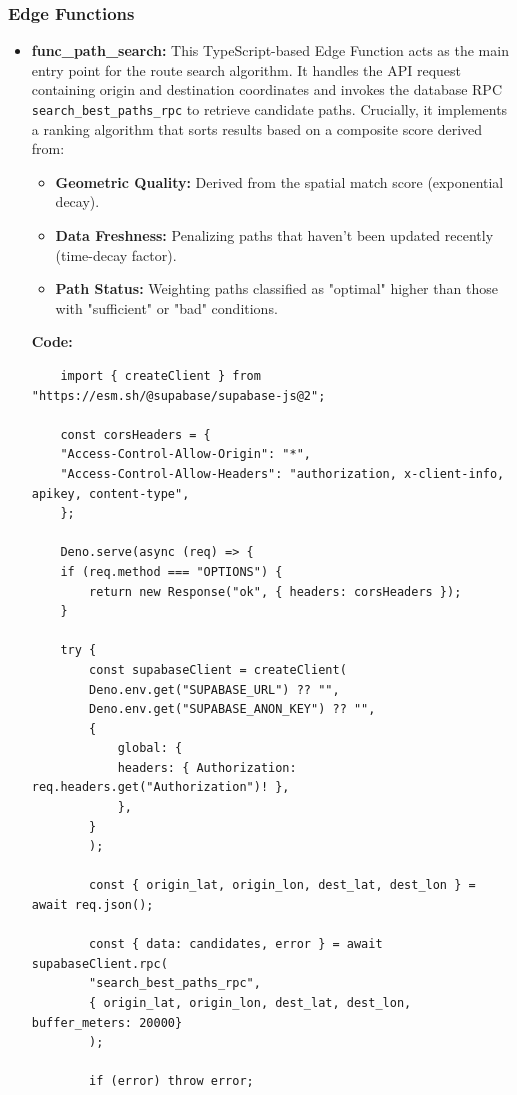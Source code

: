 \subsubsection{Edge Functions}
\begin{itemize}
    \item \textbf{func\_path\_search:} 
    This TypeScript-based Edge Function acts as the main entry point for the route search algorithm. It handles the API request containing origin and destination coordinates and invokes the database RPC \texttt{search\_best\_paths\_rpc} to retrieve candidate paths. 
    Crucially, it implements a ranking algorithm that sorts results based on a composite score derived from:
    \begin{itemize}
        \item \textbf{Geometric Quality:} Derived from the spatial match score (exponential decay).
        \item \textbf{Data Freshness:} Penalizing paths that haven't been updated recently (time-decay factor).
        \item \textbf{Path Status:} Weighting paths classified as "optimal" higher than those with "sufficient" or "bad" conditions.
    \end{itemize}
    \textbf{Code:}
    \begin{lstlisting} 
    import { createClient } from "https://esm.sh/@supabase/supabase-js@2";

    const corsHeaders = {
    "Access-Control-Allow-Origin": "*",
    "Access-Control-Allow-Headers": "authorization, x-client-info, apikey, content-type",
    };

    Deno.serve(async (req) => {
    if (req.method === "OPTIONS") {
        return new Response("ok", { headers: corsHeaders });
    }

    try {
        const supabaseClient = createClient(
        Deno.env.get("SUPABASE_URL") ?? "",
        Deno.env.get("SUPABASE_ANON_KEY") ?? "",
        {
            global: {
            headers: { Authorization: req.headers.get("Authorization")! },
            },
        }
        );

        const { origin_lat, origin_lon, dest_lat, dest_lon } = await req.json();

        const { data: candidates, error } = await supabaseClient.rpc(
        "search_best_paths_rpc",
        { origin_lat, origin_lon, dest_lat, dest_lon, buffer_meters: 20000}
        );

        if (error) throw error;


\end{lstlisting}
\end{itemize}
